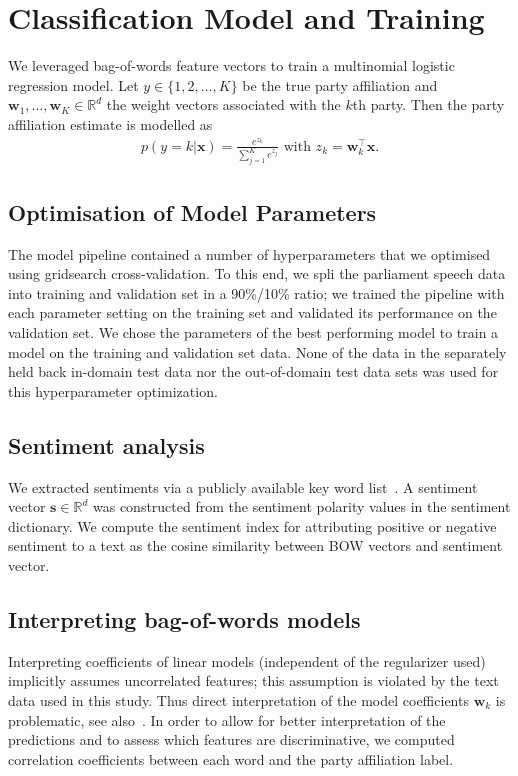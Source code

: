 \documentclass[11pt]{article}
\renewcommand{\vec}[1]{\mathbf{#1}}
\newcommand{\R}{\mathds{R}}
\begin{document}
\section{Classification Model and Training}\label{sec:model}
We leveraged bag-of-words feature vectors to train a multinomial logistic regression model. Let $y\in\{1,2,\dots,K\}$ be the true party affiliation and $\vec{w}_1,\dots,\vec{w}_K\in\R^{d}$ the weight vectors associated with the $k$th party. Then the party affiliation estimate is modelled as
\begin{eqnarray}\label{eq:logreg_multiclass}
p(y=k|\vec{x}) = \frac{e^{z_k}}{\sum_{j=1}^K e^{z_j}}  \textrm{ with }  z_k=\vec{w}_k^{\top}\vec{x}.
\end{eqnarray}

\subsection{Optimisation of Model Parameters}\label{sec:crossvalidation}
The model pipeline contained a number of hyperparameters that we optimised using gridsearch cross-validation. To this end, we spli the parliament speech data into training and validation set in a 90\%/10\% ratio; we trained the pipeline with each parameter setting on the training set and validated its performance on the validation set. We chose the parameters of the best performing model to train a model on the training and validation set data. None of the data in the separately held back in-domain test data nor the out-of-domain test data sets was used for this hyperparameter optimization. 
%
\subsection{Sentiment analysis}\label{sec:sentiment_analysis_methods}
We extracted sentiments via a publicly available key word list~\cite{remquahey2010}. A sentiment vector $\vec{s}\in\R^d$ was constructed from the sentiment polarity values in the sentiment dictionary. We compute the sentiment index for attributing positive or negative sentiment to a text as the cosine similarity between BOW vectors and sentiment vector.

\subsection{Interpreting bag-of-words models}\label{sec:correlations_methods}
Interpreting coefficients of linear models (independent of the regularizer used) implicitly assumes uncorrelated features; this assumption is violated by the text data used in this study. Thus direct interpretation of the model coefficients $\vec{w}_k$ is problematic, see also~\cite{Zien2009, Haufe2013}. In order to allow for better interpretation of the predictions and to assess which features are discriminative, we computed correlation coefficients between each word and the party affiliation label. 
\end{document}

